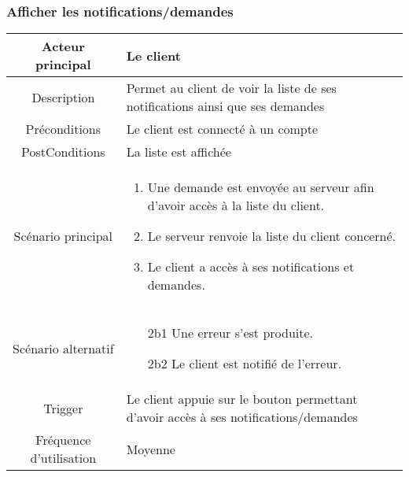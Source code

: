 \documentclass{article}
\begin{document}
\newpage

\subsubsection{Afficher les notifications/demandes}
\begin{table}[h]
   \begin{tabular}{|c|p{10cm}|}
      \hline
      Acteur principal&Le client\\
      \hline
      Description&Permet au client de voir la liste de ses notifications ainsi que ses demandes\\
      \hline
      Préconditions&Le client est connecté à un compte\\
      \hline
      PostConditions&La liste est affichée\\
      \hline
      Scénario principal& 
            \begin{enumerate}
               \item Une demande est envoyée au serveur afin d'avoir accès à la liste du client.
               \item Le serveur renvoie la liste du client concerné.
               \item Le client a accès à ses notifications et demandes.
            \end{enumerate}     \\
      \hline
      Scénario alternatif&
            \begin{itemize}
               \item[2b1] Une erreur s'est produite.
               \item[2b2] Le client est notifié de l'erreur.
            \end{itemize}      \\
      \hline
      Trigger&Le client appuie sur le bouton permettant d'avoir accès à ses notifications/demandes\\
      \hline
      Fréquence d'utilisation&Moyenne\\
      \hline
   \end{tabular}
\end{table}

\newpage
\end{document}
